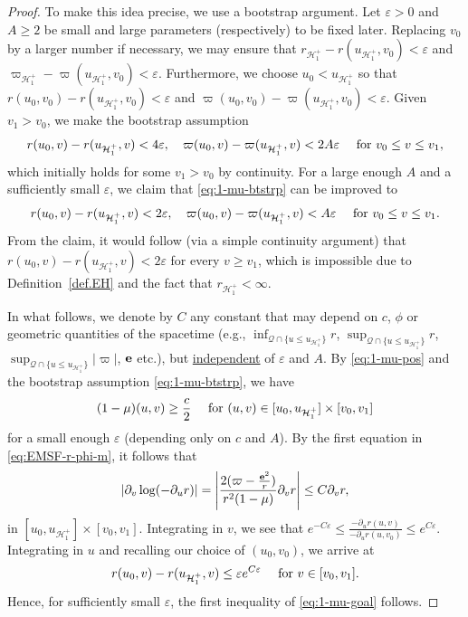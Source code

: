 \documentclass[10pt, reqno]{amsart}
\theoremstyle{definition}
\theoremstyle{remark}
\numberwithin{equation}{section}
\newcommand{\abs}[1]{\vert#1\vert}
\newcommand{\set}[1]{\{#1\}}
\newcommand{\rd}{\partial}
\newcommand{\0}{\emptyset}
\newcommand{\veps}{\varepsilon}
\newcommand{\bfe}{{\bf e}}
\newcommand{\calH}{\mathcal H}
\newcommand{\calQ}{\mathcal Q}
\newcommand{\EH}{\calH^{+}}
\newcommand{\e}{\bfe}							%
\begin{document}
\begin{proof}
To make this idea precise, we use a bootstrap argument. Let $\veps > 0$ and $A \geq 2$ be small and large parameters (respectively) to be fixed later. Replacing $v_{0}$ by a larger number if necessary, we may ensure that $r_{\EH_{1}} - r(u_{\EH_{1}}, v_{0})< \veps$ and $\varpi_{\EH_{1}} - \varpi(u_{\EH_{1}}, v_{0}) < \veps$. Furthermore, we choose $u_{0} < u_{\EH_{1}}$ so that $r(u_{0}, v_{0}) - r(u_{\EH_{1}}, v_{0}) < \veps$ and $\varpi(u_{0}, v_{0}) - \varpi(u_{\EH_{1}}, v_{0}) < \veps$. Given $v_{1} > v_{0}$, we make the bootstrap assumption
\begin{equation} \label{eq:1-mu-btstrp}
	r(u_{0}, v) - r(u_{\EH_{1}}, v) < 4 \veps, \quad
	\varpi(u_{0}, v) - \varpi(u_{\EH_{1}}, v) < 2 A \veps \quad 
	\hbox{ for } v_{0} \leq v \leq v_{1},
\end{equation}
which initially holds for some $v_{1} > v_{0}$ by continuity.
For a large enough $A$ and a sufficiently small $\veps$, we claim that \eqref{eq:1-mu-btstrp} can be improved to
\begin{equation} \label{eq:1-mu-goal}
	r(u_{0}, v) - r(u_{\EH_{1}}, v) < 2 \veps, \quad
	\varpi(u_{0}, v) - \varpi(u_{\EH_{1}}, v) < A \veps \quad 
	\hbox{ for } v_{0} \leq v \leq v_{1}.
\end{equation}
From the claim, it would follow (via a simple continuity argument) that $r(u_{0}, v) - r(u_{\EH_{1}}, v) < 2\veps$ for every $v \geq v_{1}$, which is impossible due to Definition~\ref{def.EH} and the fact that $r_{\EH_{1}} < \infty$.

In what follows, we denote by $C$ any constant that may depend on $c$, $\phi$ or geometric quantities of the spacetime (e.g., $\inf_{\calQ \cap \set{u \leq u_{\EH_{1}}}} r$, $\sup_{\calQ \cap \set{u \leq u_{\EH_{1}}}} r$, $\sup_{\calQ \cap \set{u \leq u_{\EH_{1}}}} \abs{\varpi}$, $\e$ etc.), but \underline{independent} of $\veps$ and $A$. By \eqref{eq:1-mu-pos} and the bootstrap assumption \eqref{eq:1-mu-btstrp}, we have
\begin{equation*}
	(1-\mu)(u, v) \geq \frac{c}{2} \quad \hbox{ for } (u, v) \in [u_{0}, u_{\EH_{1}}] \times [v_{0}, v_{1}]
\end{equation*}
for a small enough $\veps$ (depending only on $c$ and $A$). By the first equation in \eqref{eq:EMSF-r-phi-m}, it follows that
\begin{equation*}
	\abs{\rd_{v} \log(-\rd_{u} r)} = \left\vert \frac{2 (\varpi - \frac{\e^{2}}{r})}{r^{2} (1-\mu)} \rd_{v} r\right\vert
	\leq C \rd_{v} r,
\end{equation*}
in $[u_{0}, u_{\EH_{1}}] \times [v_{0}, v_{1}]$. Integrating in $v$, we see that $e^{- C \veps} \leq \frac{- \rd_{u} r(u, v)}{- \rd_{u} r(u, v_{0})} \leq e^{C \veps}$. Integrating in $u$ and recalling our choice of $(u_{0}, v_{0})$, we arrive at
\begin{equation*}
	r(u_{0}, v) - r(u_{\EH_{1}}, v) \leq \veps e^{C \veps} \quad \hbox{ for } v \in [v_{0}, v_{1}].
\end{equation*}
Hence, for sufficiently small $\veps$, the first inequality of \eqref{eq:1-mu-goal} follows.


\end{proof}
\end{document}

